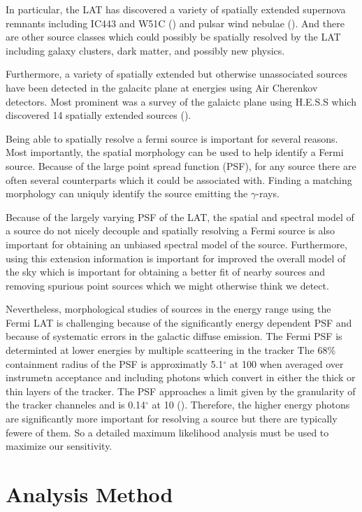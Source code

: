 \documentclass[12pt,preprint]{aastex}
\newcommand{\mev}{\text{MeV}\xspace}
\newcommand{\gev}{\text{GeV}\xspace}
\newcommand{\tev}{\text{TeV}\xspace}
\renewcommand{\deg}{\ensuremath{^\circ}\xspace}
\begin{document}
In particular, the LAT has discovered a variety of spatially extended
supernova remnants including IC443 and W51C (\cite{ic443,w51c}) and pulsar
wind nebulae (\cite{msh1552,velax}). And there are other source classes
which could possibly be spatially resolved by the LAT including galaxy
clusters, dark matter, and possibly new physics.

Furthermore, a variety of spatially extended but otherwise unassociated
sources have been detected in the galacitc plane at \tev energies using
Air Cherenkov detectors. Most prominent was a survey of the galaictc
plane using H.E.S.S which discovered 14 spatially extended sources
(\cite{HESS_plane_survey}).

Being able to spatially resolve a fermi source is important for several
reasons. Most importantly, the spatial morphology can be used to help
identify a Fermi source. Because of the large point spread function (PSF),
for any source there are often several counterparts which it could be
associated with. Finding a matching morphology can uniquly identify the
source emitting the $\gamma$-rays. 

Because of the largely varying PSF of the LAT, the spatial and spectral
model of a source do not nicely decouple and spatially resolving a Fermi
source is also important for obtaining an unbiased spectral model of
the source.  Furthermore, using this extension information is important
for improved the overall model of the sky which is important for obtaining
a better fit of nearby sources and removing spurious point sources which
we might otherwise think we detect.

Nevertheless, morphological studies of sources in the \gev energy range
using the Fermi LAT is challenging because of the significantly energy
dependent PSF and because of systematic errors in the galactic diffuse
emission.  The Fermi PSF is determinted at lower energies by multiple
scatteering in the tracker The 68\% containment radius of the PSF is
approximatly 5.1\deg at 100 \mev  when averaged over instrumetn acceptance
and including photons which convert in either the thick or thin layers of
the tracker.  The PSF approaches a limit given by the granularity of the
tracker channeles and is 0.14\deg at 10 \gev (\cite{on_orbit_calibration}).
Therefore, the higher energy photons are significantly more important for
resolving a source but there are typically fewere of them.  So a detailed
maximum likelihood analysis must be used to maximize our sensitivity.

\section{Analysis Method}
\end{document}
